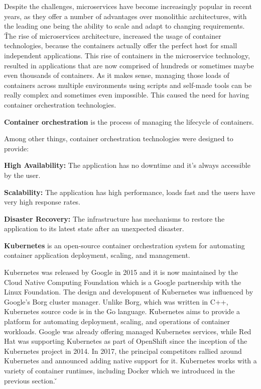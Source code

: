 Despite the challenges, microservices have become increasingly popular in recent years, as they offer a number of
advantages over monolithic architectures, with the leading one being the ability to scale and adapt to changing
requirements. \v

The rise of microservices architecture, increased the usage of container technologies, because the containers
actually offer the perfect host for small independent applications. This rise of containers in the microservice
technology, resulted in applications that are now comprised of hundreds or sometimes maybe even thousands of
containers. As it makes sense, managing those loads of containers across multiple environments using scripts and
self-made tools can be really complex and sometimes even impossible. This caused the need for having container
orchestration technologies.

\textbf{Container orchestration} is the process of managing the lifecycle of containers.
\ed

Among other things, container orchestration technologies were designed to provide:
\bit
\item \textbf{High Availability:} The application has no downtime and it's always accessible by the user.
\item \textbf{Scalability:} The application has high performance, loads fast and the users have very high response
rates.
\item \textbf{Disaster Recovery:} The infrastructure has mechanisms to restore the application to its latest state after
an unexpected disaster.
\eit

\bd[Kubernetes]
\textbf{Kubernetes} is an open-source container orchestration system for automating container application deployment,
scaling, and management.
\ed

Kubernetes was released by Google in 2015 and it is now maintained by the Cloud Native Computing Foundation which is a
Google partnership with the Linux Foundation. The design and development of Kubernetes was influenced by Google's Borg
cluster manager. Unlike Borg, which was written in C++, Kubernetes source code is in the Go language. \v

Kubernetes aims to provide a platform for automating deployment, scaling, and operations of container workloads.
Google was already offering managed Kubernetes services, while Red Hat was supporting Kubernetes as part of OpenShift
since the inception of the Kubernetes project in 2014. In 2017, the principal competitors rallied around Kubernetes
and announced adding native support for it. Kubernetes works with a variety of container runtimes, including Docker
which we introduced in the previous section. \v

